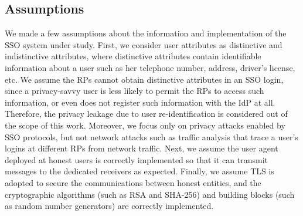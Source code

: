 \subsection{Assumptions}
We made a few assumptions about the information and implementation of the SSO system under study. First, we consider user attributes as distinctive and indistinctive attributes, where distinctive attributes contain identifiable information about a user such as her telephone number, address, driver's license, etc. We assume the RPs cannot obtain distinctive attributes in an SSO login, since a privacy-savvy user is less likely to permit the RPs to access such information, or even does not register such information with the IdP at all. Therefore, the privacy leakage due to user re-identification is considered out of the scope of this work. Moreover, we focus only on privacy attacks enabled by SSO protocols, but not network attacks such as traffic analysis that trace a user's logins at different RPs from network traffic. Next, we assume the user agent deployed at honest users is correctly implemented so that it can transmit messages to the dedicated receivers as expected. Finally, we assume TLS is adopted to secure the communications between honest entities, and the cryptographic algorithms (such as RSA and SHA-256) and building blocks (such as random number generators) are correctly implemented.






